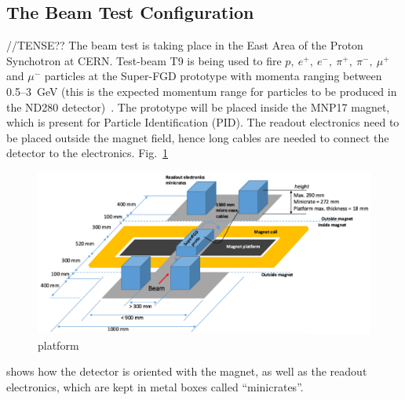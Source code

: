 \documentclass[aps,pra,12pt,notitlepage,tightenlines]{revtex4-1}
\begin{document}

\subsection{The Beam Test Configuration} //TENSE??
The beam test is taking place in the East Area of the Proton Synchotron at CERN. Test-beam T9 is being used to fire $p, \ e^+, \ e^-, \ \pi^+, \ \pi^-, \ \mu^+$ and $\mu^-$ particles at the Super-FGD prototype with momenta ranging between 0.5--3~GeV (this is the expected momentum range for particles to be produced in the ND280 detector)~\cite{Durieu2001}. The prototype will be placed inside the MNP17 magnet, which is present for Particle Identification (PID). The readout electronics need to be placed outside the magnet field, hence long cables are needed to connect the detector to the electronics. Fig.\ \ref{fig:plat}
\begin{figure}
 \includegraphics[scale=0.8]{platform}
 \caption{platform}
 \label{fig:plat}
\end{figure}
shows how the detector is oriented with the magnet, as well as the readout electronics, which are kept in metal boxes called ``minicrates''.
\end{document}
